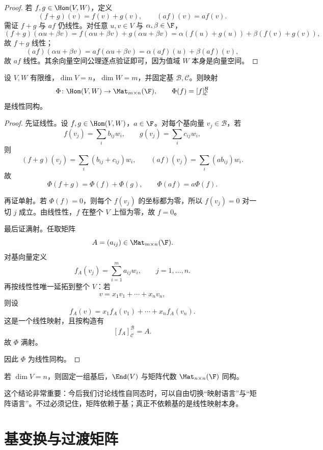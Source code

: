 \begin{proof}
若 $f,g\in\Hom(V,W)$，定义
\[
  (f+g)(v)=f(v)+g(v),\qquad (af)(v)=a f(v).
\]
需证 $f+g$ 与 $af$ 仍线性。对任意 $u,v\in V$ 与 $\alpha,\beta\in\F$，
\[
  (f+g)(\alpha u+\beta v)
  =f(\alpha u+\beta v)+g(\alpha u+\beta v)
  =\alpha(f(u)+g(u))+\beta(f(v)+g(v)),
\]
故 $f+g$ 线性；
\[
  (af)(\alpha u+\beta v)=a f(\alpha u+\beta v)=\alpha(af)(u)+\beta(af)(v),
\]
故 $af$ 线性。其余向量空间公理逐点验证即可，因为值域 $W$ 本身是向量空间。
\end{proof}

\begin{theorem}
设 $V,W$ 有限维，$\dim V=n$，$\dim W=m$，并固定基 $\mathcal B,\mathcal C$。则映射
\[
  \Phi\colon \Hom(V,W)\to \Mat_{m\times n}(\F),
  \qquad
  \Phi(f)=[f]_{\mathcal C}^{\mathcal B}
\]
是线性同构。
\end{theorem}

\begin{proof}
先证线性。设 $f,g\in\Hom(V,W)$，$a\in\F$。对每个基向量 $v_j\in\mathcal B$，若
\[
  f(v_j)=\sum_i b_{ij}w_i,
  \qquad
  g(v_j)=\sum_i c_{ij}w_i,
\]
则
\[
  (f+g)(v_j)=\sum_i (b_{ij}+c_{ij})w_i,
  \qquad
  (af)(v_j)=\sum_i (ab_{ij})w_i.
\]
故
\[
  \Phi(f+g)=\Phi(f)+\Phi(g),
  \qquad
  \Phi(af)=a\Phi(f).
\]

再证单射。若 $\Phi(f)=0$，则每个 $f(v_j)$ 的坐标都为零，所以 $f(v_j)=0$ 对一切 $j$ 成立。由线性性，$f$ 在整个 $V$ 上恒为零，故 $f=0$。

最后证满射。任取矩阵
\[
  A=(a_{ij})\in\Mat_{m\times n}(\F).
\]
对基向量定义
\[
  f_A(v_j)=\sum_{i=1}^m a_{ij}w_i,
  \qquad j=1,\dots,n.
\]
再按线性性唯一延拓到整个 $V$：若
\[
  v=x_1v_1+\cdots+x_nv_n,
\]
则设
\[
  f_A(v)=x_1f_A(v_1)+\cdots+x_nf_A(v_n).
\]
这是一个线性映射，且按构造有
\[
  [f_A]_{\mathcal C}^{\mathcal B}=A.
\]
故 $\Phi$ 满射。

因此 $\Phi$ 为线性同构。
\end{proof}

\begin{corollary}
若 $\dim V=n$，则固定一组基后，$\End(V)$ 与矩阵代数 $\Mat_{n\times n}(\F)$ 同构。
\end{corollary}

\begin{remark}
这个结论非常重要：今后我们讨论线性自同态时，可以自由切换“映射语言”与“矩阵语言”。不过必须记住，矩阵依赖于基；真正不依赖基的是线性映射本身。
\end{remark}

\section{基变换与过渡矩阵}

